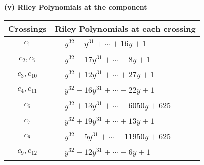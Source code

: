 \documentclass[1p]{elsarticle_modified}
\theoremstyle{definition}
\begin{document}
\newpage\renewcommand{\arraystretch}{1}
\flushleft \textbf{(v) Riley Polynomials at the component}\newline \\
\begin{tabular}{m{50pt}|m{274pt}}
Crossings & \hspace{64pt}Riley Polynomials at each crossing \\
\hline $$\begin{aligned}c_{1}\end{aligned}$$&$\begin{aligned}
&y^{32}- y^{31}+\cdots+16 y+1
\end{aligned}$\\
\hline $$\begin{aligned}c_{2},c_{5}\end{aligned}$$&$\begin{aligned}
&y^{32}-17 y^{31}+\cdots-8 y+1
\end{aligned}$\\
\hline $$\begin{aligned}c_{3},c_{10}\end{aligned}$$&$\begin{aligned}
&y^{32}+12 y^{31}+\cdots+27 y+1
\end{aligned}$\\
\hline $$\begin{aligned}c_{4},c_{11}\end{aligned}$$&$\begin{aligned}
&y^{32}-16 y^{31}+\cdots-22 y+1
\end{aligned}$\\
\hline $$\begin{aligned}c_{6}\end{aligned}$$&$\begin{aligned}
&y^{32}+13 y^{31}+\cdots-6050 y+625
\end{aligned}$\\
\hline $$\begin{aligned}c_{7}\end{aligned}$$&$\begin{aligned}
&y^{32}+19 y^{31}+\cdots+13 y+1
\end{aligned}$\\
\hline $$\begin{aligned}c_{8}\end{aligned}$$&$\begin{aligned}
&y^{32}-5 y^{31}+\cdots-11950 y+625
\end{aligned}$\\
\hline $$\begin{aligned}c_{9},c_{12}\end{aligned}$$&$\begin{aligned}
&y^{32}-12 y^{31}+\cdots-6 y+1
\end{aligned}$\\
\hline
\end{tabular}\\~\\
\end{document}

